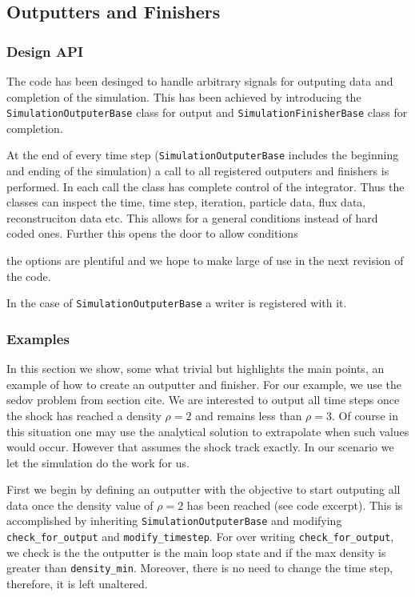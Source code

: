 \subsection{Outputters and Finishers}
\label{sec.outputters}

\subsubsection{Design API}
The code has been desinged to handle arbitrary signals for outputing data
and completion of the simulation. This has been achieved by introducing the
\lstinline{SimulationOutputerBase} class for output and
\lstinline{SimulationFinisherBase} class for completion.

At the end of every
time step (\lstinline{SimulationOutputerBase} includes the beginning and ending
of the simulation) a call to all registered outputers and finishers is
performed. In each call the class has complete control of the integrator. Thus
the classes can inspect the time, time step, iteration, particle data, flux data,
reconstruciton data etc. This allows for a general conditions instead of hard
coded ones. Further this opens the door to allow conditions

the options are plentiful and we hope to make large of use in the next
revision of the code.

In the case of \lstinline{SimulationOutputerBase} a writer is registered with it.

\subsubsection{Examples}
In this section we show, some what trivial but highlights the main points, an example of
how to create an outputter and finisher. For our example, we use the sedov problem from 
section cite. We are interested to output all time steps once the shock has reached
a density $\rho=2$ and remains less than $\rho=3$. Of course in this situation one may
use the analytical solution to extrapolate when such values would occur. However that
assumes the shock track exactly. In our scenario we let the simulation do the work
for us.

First we begin by defining an outputter with the objective to start outputing
all data once the density value of $\rho=2$ has been reached (see code excerpt). This
is accomplished by inheriting \lstinline{SimulationOutputerBase} and modifying
\lstinline{check_for_output} and \lstinline{modify_timestep}. For over writing
\lstinline{check_for_output}, we check is the the outputter is the main loop state
and if the max density is greater than \lstinline{density_min}. Moreover, there
is no need to change the time step, therefore, it is left unaltered.


